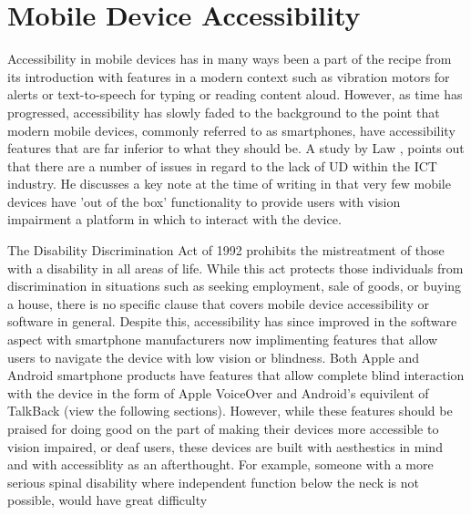 
\section{Mobile Device Accessibility}
Accessibility in mobile devices has in many ways been a part of the recipe from its introduction with features in a modern context such as vibration motors for alerts or text-to-speech for typing or reading content aloud.
However, as time has progressed, accessibility has slowly faded to the background to the point that modern mobile devices, commonly referred to as smartphones, have accessibility features that are far inferior to what they should be. %
A study by Law \cite{cellphone}, points out that there are a number of issues in regard to the lack of UD within the ICT industry. %
He discusses a key note at the time of writing in that very few mobile devices have 'out of the box' functionality to provide users with vision impairment a platform in which to interact with the device. %

The Disability Discrimination Act of 1992\cite{dda1992} prohibits the mistreatment of those with a disability in all areas of life.
While this act protects those individuals from discrimination in situations such as seeking employment, sale of goods, or buying a house, there is no specific clause that covers mobile device accessibility or software in general.
Despite this, accessibility has since improved in the software aspect with smartphone manufacturers now implimenting features that allow users to navigate the device with low vision or blindness.
Both Apple and Android smartphone products have features that allow complete blind interaction with the device in the form of Apple VoiceOver \cite{iphone} and Android's equivilent of TalkBack \cite{android} (view the following sections).
However, while these features should be praised for doing good on the part of making their devices more accessible to vision impaired, or deaf users, these devices are built with aesthestics in mind and with accessiblity as an afterthought.
For example, someone with a more serious spinal disability where independent function below the neck is not possible, would have great difficulty 

